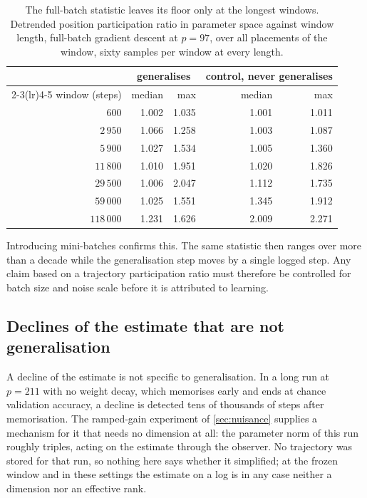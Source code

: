 \documentclass{article}
\begin{document}
\begin{table}[H]
\centering
\caption{The full-batch statistic leaves its floor only at the longest windows. Detrended position
participation ratio in parameter space against window length, full-batch gradient descent at
$p = 97$, over all placements of the window, sixty samples per window at every length.}
\label{tab:prwindow}
\begin{tabular}{rrrrr}
\toprule
& \multicolumn{2}{c}{generalises} & \multicolumn{2}{c}{control, never generalises} \\
\cmidrule(lr){2-3}\cmidrule(lr){4-5}
window (steps) & median & max & median & max \\
\midrule
$600$      & 1.002 & 1.035 & 1.001 & 1.011 \\
$2\,950$   & 1.066 & 1.258 & 1.003 & 1.087 \\
$5\,900$   & 1.027 & 1.534 & 1.005 & 1.360 \\
$11\,800$  & 1.010 & 1.951 & 1.020 & 1.826 \\
$29\,500$  & 1.006 & 2.047 & 1.112 & 1.735 \\
$59\,000$  & 1.025 & 1.551 & 1.345 & 1.912 \\
$118\,000$ & 1.231 & 1.626 & 2.009 & 2.271 \\
\bottomrule
\end{tabular}
\end{table}

Introducing mini-batches confirms this. The same statistic then ranges over more than a decade
while the generalisation step moves by a single logged step. Any claim based on a trajectory participation
ratio must therefore be controlled for batch size and noise scale before it is attributed to
learning.

\subsection{Declines of the estimate that are not generalisation}\label{app:falls}

A decline of the estimate is not specific to generalisation. In a long run at $p = 211$ with no
weight decay, which memorises early and ends at chance validation accuracy, a decline is detected
tens of thousands of steps after memorisation. The ramped-gain experiment of \cref{sec:nuisance}
supplies a mechanism for it that needs no dimension at all: the parameter norm of this run roughly
triples, acting on the estimate through the observer. No trajectory was stored for that run, so nothing here says
whether it simplified; at the frozen window and in these settings the estimate on a log is in any
case neither a dimension nor an effective rank.
\end{document}
